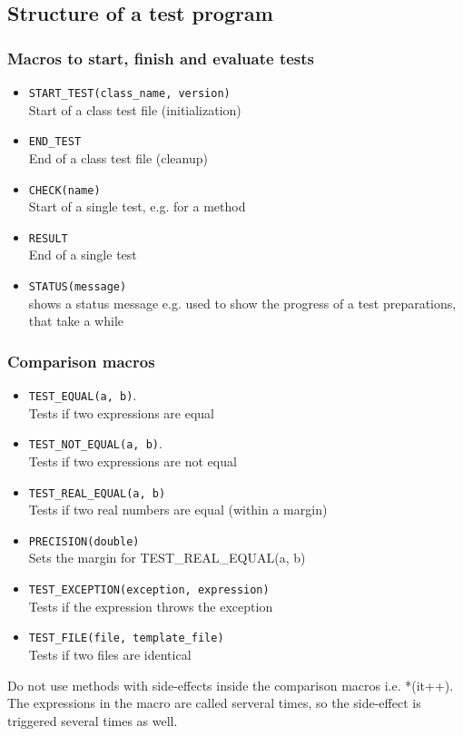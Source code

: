 \documentclass[a4]{article}
\begin{document}
\subsection{Structure of a test program}

\subsubsection{Macros to start, finish and evaluate tests}
\begin{itemize}
        \item {\tt START\_TEST(class\_name, version)} \\ Start of a class test file (initialization)
        \item {\tt END\_TEST} \\ End of a class test file (cleanup)
        \item {\tt CHECK(name)} \\ Start of a single test, e.g. for a method
        \item {\tt RESULT} \\ End of a single test
        \item {\tt STATUS(message)} \\ shows a status message e.g. used to show the progress of a test preparations, that take a while
\end{itemize}

\subsubsection{Comparison macros}
\begin{itemize}
        \item {\tt TEST\_EQUAL(a, b)}.\\ Tests if two expressions are equal
        \item {\tt TEST\_NOT\_EQUAL(a, b)}.\\ Tests if two expressions are not equal
        \item {\tt TEST\_REAL\_EQUAL(a, b)} \\ Tests if two real numbers are equal (within a margin)
        \item {\tt PRECISION(double)} \\ Sets the margin for TEST\_REAL\_EQUAL(a, b)
        \item {\tt TEST\_EXCEPTION(exception, expression)} \\ Tests if the expression throws the exception
        \item {\tt TEST\_FILE(file, template\_file)} \\ Tests if two files are identical
\end{itemize}
Do not use methods with side-effects inside the comparison macros i.e. *(it++). The expressions
in the macro are called serveral times, so the side-effect is triggered several times as well. 
\end{document}

